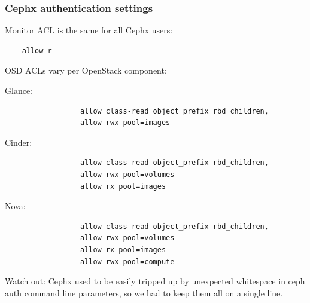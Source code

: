 \documentclass[hyperref=unicode,utf8,xcolor=pst,aspectratio=169]{beamer}
\begin{document}
\begin{frame}[fragile]
	\frametitle{Cephx authentication settings}
	\lstset{basicstyle=\ttfamily\footnotesize}

	Monitor ACL is the same for {\color{mirantisred}all} Cephx users:
	\vspace{-1ex}
	\begin{lstlisting}
	allow r
	\end{lstlisting}
	\vspace{1ex}

	OSD ACLs vary per OpenStack component:
	\vspace{-1ex}
	\begin{description}
		\item[Glance:]
			\begin{lstlisting}
			allow class-read object_prefix rbd_children,
			allow rwx pool=images
			\end{lstlisting}

		\vspace{-1.5ex}
		\item[Cinder:]
			\begin{lstlisting}
			allow class-read object_prefix rbd_children,
			allow rwx pool=volumes
			allow rx pool=images
			\end{lstlisting}

		\vspace{-1.5ex}
		\item[Nova:]
			\begin{lstlisting}
			allow class-read object_prefix rbd_children,
			allow rwx pool=volumes
			allow rx pool=images
			allow rwx pool=compute
			\end{lstlisting}
	\end{description}

	{\color{mirantisred}Watch out:} Cephx used to be easily tripped up by
	unexpected whitespace in ceph auth command line parameters, so we had
	to keep them all on a single line.
\end{frame}
\end{document}
